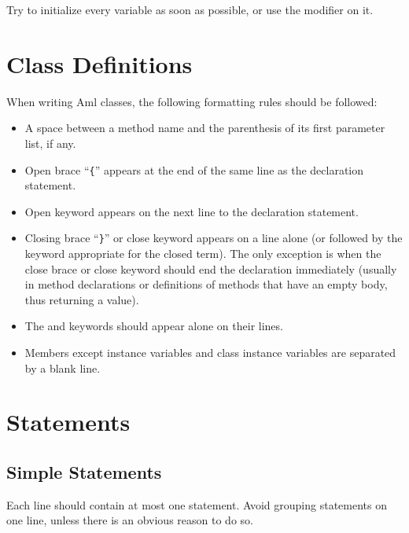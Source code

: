 Try to initialize every variable as soon as possible, or use the  modifier on it. 






\section{Class Definitions}

When writing Aml classes, the following formatting rules should be followed: 
\begin{itemize}
  \item A space between a method name and the parenthesis of its first parameter list, if any. 
  \item Open brace ``\lstinline!{!'' appears at the end of the same line as the declaration statement. 
  \item Open keyword  appears on the next line to the declaration statement. 
  \item Closing brace ``\lstinline!}!'' or close keyword  appears on a line alone (or followed by the keyword appropriate for the closed term). The only exception is when the close brace or close keyword should end the declaration immediately (usually in method declarations or definitions of methods that have an empty body, thus returning a  value). 
  \item The  and  keywords should appear alone on their lines. 
  \item Members except instance variables and class instance variables are separated by a blank line. 
\end{itemize}





\section{Statements}






\subsection{Simple Statements}

Each line should contain at most one statement. Avoid grouping statements on one line, unless there is an obvious reason to do so. 





